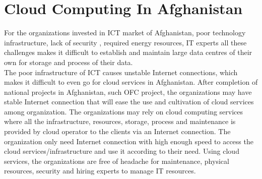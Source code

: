 \section{Cloud Computing In Afghanistan}

For the organizations invested in ICT market of Afghanistan, poor technology infrastructure, lack of security , required energy resources, IT experts all these challenges makes it difficult to establish and  maintain large data centres of their own for storage and process of their data.\\

 The poor infrastructure of ICT causes unstable Internet connections, which makes it difficult to even go for cloud services in Afghanistan. After completion of national projects in Afghanistan, such OFC‌ project, the organizations may have stable Internet connection that will ease the use and cultivation of cloud services among organization. The organizations may rely on cloud computing services where all the infrastructure, resources, storage, process and maintenance is provided by cloud operator to the clients via an Internet connection. The organization only need Internet connection with high enough speed to access the cloud services/infrastructure and use it according to their need. Using cloud services, the organizations are free of headache for maintenance, physical resources, security and hiring experts to manage IT resources.\\
 
   
    
 


